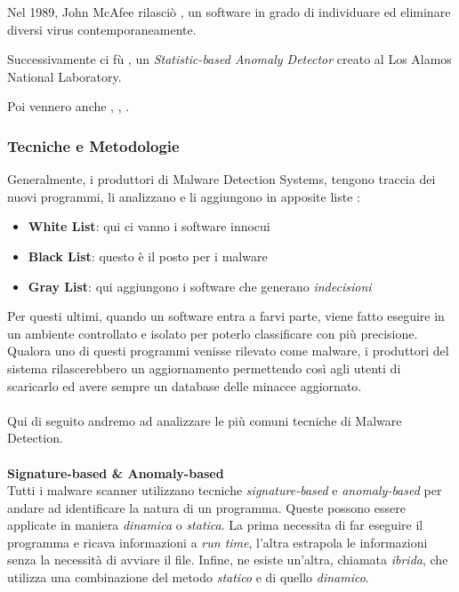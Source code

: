 Nel 1989, John McAfee rilasciò , un software in grado di individuare ed eliminare diversi virus contemporaneamente.

Successivamente ci fù , un \textit{Statistic-based Anomaly Detector} creato al Los Alamos National Laboratory. 

Poi vennero anche , , .

\pagebreak

\subsubsection{Tecniche e Metodologie}
Generalmente, i produttori di Malware Detection Systems, tengono traccia dei nuovi programmi, li analizzano e li aggiungono in apposite liste \cite{malware}:

\begin{itemize}
    \item \textbf{White List}: qui ci vanno i software innocui
    \item \textbf{Black List}: questo è il posto per i malware
    \item \textbf{Gray List}: qui aggiungono i software che generano \textit{indecisioni}
\end{itemize}

Per questi ultimi, quando un software entra a farvi parte, viene fatto eseguire in un ambiente controllato e isolato per poterlo classificare con più precisione. Qualora uno di questi programmi venisse rilevato come malware, i produttori del sistema rilascerebbero un aggiornamento permettendo così agli utenti di scaricarlo ed avere sempre un database delle minacce aggiornato.\\
\\
Qui di seguito andremo ad analizzare le più comuni tecniche di Malware Detection.\\
\\
\textbf{Signature-based \& Anomaly-based}\\
Tutti i malware scanner utilizzano tecniche \textit{signature-based} e \textit{anomaly-based} per andare ad identificare la natura di un programma. Queste possono essere applicate in maniera \textit{dinamica} o \textit{statica}. La prima necessita di far eseguire il programma e ricava informazioni a \textit{run time}, l'altra estrapola le informazioni senza la necessità di avviare il file. Infine, ne esiste un'altra, chiamata \textit{ibrida}, che utilizza una combinazione del metodo \textit{statico} e di quello \textit{dinamico}.

